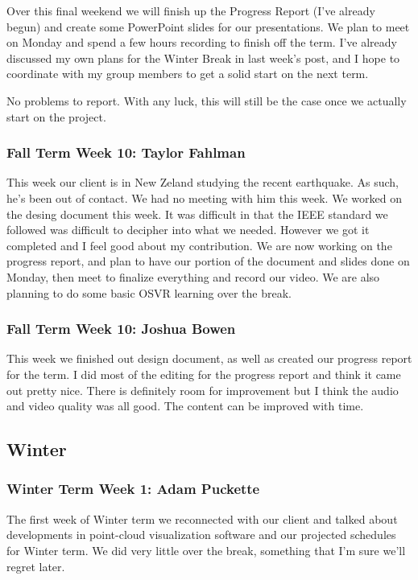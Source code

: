 \documentclass[draftclsnofoot,onecolumn]{IEEEtran}
\begin{document}
Over this final weekend we will finish up the Progress Report (I've already begun) and create some PowerPoint slides for our presentations. We plan to meet on Monday and spend a few hours recording to finish off the term. I've already discussed my own plans for the Winter Break in last week's post, and I hope to coordinate with my group members to get a solid start on the next term.

No problems to report. With any luck, this will still be the case once we actually start on the project.

\subsubsection{Fall Term Week 10: Taylor Fahlman}

This week our client is in New Zeland studying the recent earthquake. As such, he's been out of contact. We had no meeting with him this week. We worked on the desing document this week. It was difficult in that the IEEE standard we followed was difficult to decipher into what we needed. However we got it completed and I feel good about my contribution. We are now working on the progress report, and plan to have our portion of the document and slides done on Monday, then meet to finalize everything and record our video. We are also planning to do some basic OSVR learning over the break.

\subsubsection{Fall Term Week 10: Joshua Bowen}

This week we finished out design document, as well as created our progress report for the term. I did most of the editing for the progress report and think it came out pretty nice. There is definitely room for improvement but I think the audio and video quality was all good. The content can be improved with time.

\subsection{Winter}

\subsubsection{Winter Term Week 1: Adam Puckette}

The first week of Winter term we reconnected with our client and talked about developments in point-cloud visualization software and our projected schedules for Winter term. We did very little over the break, something that I'm sure we'll regret later.
\end{document}
